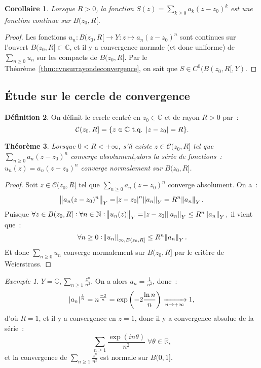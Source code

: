 \documentclass{report}
\newtheorem{thm}{Théorème}[chapter]
\newtheorem{cor}[thm]{Corollaire}
\theoremstyle{definition}
\newtheorem{déf}[thm]{Définition}
\theoremstyle{remark}
\newtheorem{ex}{Exemple}[chapter]
\numberwithin{equation}{section}
\newcommand{\C}{\mathbb C}
\newcommand{\R}{\mathbb R}
\newcommand{\N}{\mathbb N}
\newcommand{\tq}{\text{ t.q. }}
\newcommand{\pinfty}{{+\infty}}
\begin{document}
			\begin{cor} Lorsque $R > 0$, la fonction $S(z) = \sum_{k \geq 0}a_k(z - z_0)^k$ est une fonction continue sur $B(z_0, R[$.
			\end{cor}

			\begin{proof} Les fonctions $u_n : B(z_0, R[ \to Y : z \mapsto a_n(z - z_0)^n$ sont continues sur l'ouvert $B(z_0, R[ \subset \C$, et il y a
			convergence normale (et donc uniforme) de $\sum_{n \geq 0}u_n$ sur les compacts de $B(z_0, R[$. Par le Théorème~\ref{thm:cvnsurrayondeconvergence},
			on sait que $S \in C^0(B(z_0, R[, Y)$.
			\end{proof}
		\subsection{Étude sur le cercle de convergence}
			\begin{déf} On définit le cercle centré en $z_0 \in \C$ et de rayon $R > 0$ par~:
			\begin{equation}
				\mathcal C(z_0, R] = \{z \in \C \tq \abs {z - z_0} = R\}.
			\end{equation}
			\end{déf}

			\begin{thm}Lorsque $0 < R < \pinfty$, s'il existe $z \in \mathcal C(z_0, R]$ tel que $\sum_{n \geq 0}a_n(z - z_0)^n$ converge absolument,alors la
			série de fonctions~: $u_n(z) = a_n(z - z_0)^n$ converge normalement sur $B(z_0, R]$.
			\end{thm}

			\begin{proof} Soit $z \in \mathcal C(z_0, R]$ tel que $\sum_{n \geq 0}a_n(z - z_0)^n$ converge absolument. On a~:
			\begin{equation}
				\norm {a_n(z - z_0)^n}_Y = \abs {z - z_0}^n\norm {a_n}_Y = R^n\norm {a_n}_Y.
			\end{equation}
			Puisque $\forall z \in B(z_0, R] : \forall n \in \N : \norm {u_n(z)}_Y = \abs {z - z_0}\norm {a_n}_Y \leq R^n\norm {a_n}_Y,$
			il vient que~:
			\begin{equation}
				\forall n \geq 0 : \norm {u_n}_{\infty, B(z_0, R]} \leq R^n\norm {a_n}_Y.
			\end{equation}
			Et donc $\sum_{n \geq 0}u_n$ converge normalement sur $B(z_0, R]$ par le critère de Weierstrass.
			\end{proof}

			\begin{ex} $Y = \C, \sum_{n \geq 1}\frac {z^n}{n^2}$. On a alors $a_n = \frac 1{n^2}$, donc~:
			\begin{equation}
				\abs {a_n}^{\frac 1n} = n^{\frac {-2}n} = \exp\left(-2\frac {\ln n}n\right) \xrightarrow[n \to \pinfty]{} 1,
			\end{equation}
			d'où $R = 1$, et il y a convergence en $z = 1$, donc il y a convergence absolue de la série~:
			\begin{equation}
				\sum_{n \geq 1}\frac {\exp(in\theta)}{n^2} \; \forall \theta \in \R,
			\end{equation}
			et la convergence de $\sum_{n \geq 1}\frac {z^n}{n^2}$ est normale sur $B(0, 1]$.
			\end{ex}
\end{document}
